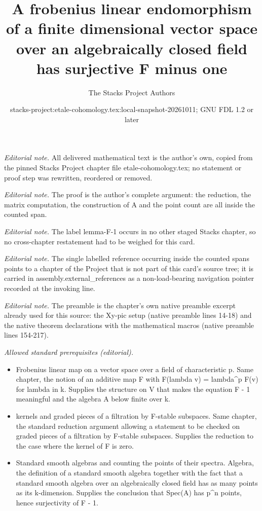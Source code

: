 \documentclass[10pt,a4paper]{amsart}
\title{A frobenius linear endomorphism of a finite dimensional vector space over an algebraically closed field has surjective F minus one}
\author{The Stacks Project Authors}
\date{stacks-project:etale-cohomology.tex:local-snapshot-20261011; GNU FDL 1.2 or later}
\theoremstyle{plain}
\theoremstyle{definition}
\theoremstyle{remark}
\numberwithin{equation}{subsection}
\begin{document}
\maketitle
\noindent\textit{Editorial note.} All delivered mathematical text is the author's own, copied from the pinned Stacks Project chapter file etale-cohomology.tex; no statement or proof step was rewritten, reordered or removed.\par\medskip
\noindent\textit{Editorial note.} The proof is the author's complete argument: the reduction, the matrix computation, the construction of A and the point count are all inside the counted span.\par\medskip
\noindent\textit{Editorial note.} The label lemma-F-1 occurs in no other staged Stacks chapter, so no cross-chapter restatement had to be weighed for this card.\par\medskip
\noindent\textit{Editorial note.} The single labelled reference occurring inside the counted spans points to a chapter of the Project that is not part of this card's source tree; it is carried in assembly.external\_references as a non-load-bearing navigation pointer recorded at the invoking line.\par\medskip
\noindent\textit{Editorial note.} The preamble is the chapter's own native preamble excerpt already used for this source: the Xy-pic setup (native preamble lines 14-18) and the native theorem declarations with the mathematical macros (native preamble lines 154-217).\par\medskip
\noindent\textit{Allowed standard prerequisites (editorial).}\begin{itemize}
\item Frobenius linear map on a vector space over a field of characteristic p. Same chapter, the notion of an additive map F with F(lambda v) = lambda\textasciicircum{}p F(v) for lambda in k. Supplies the structure on V that makes the equation F - 1 meaningful and the algebra A below finite over k.
\item kernels and graded pieces of a filtration by F-stable subspaces. Same chapter, the standard reduction argument allowing a statement to be checked on graded pieces of a filtration by F-stable subspaces. Supplies the reduction to the case where the kernel of F is zero.
\item Standard smooth algebras and counting the points of their spectra. Algebra, the definition of a standard smooth algebra together with the fact that a standard smooth algebra over an algebraically closed field has as many points as its k-dimension. Supplies the conclusion that Spec(A) has p\textasciicircum{}n points, hence surjectivity of F - 1.
\end{itemize}\medskip
\end{document}
